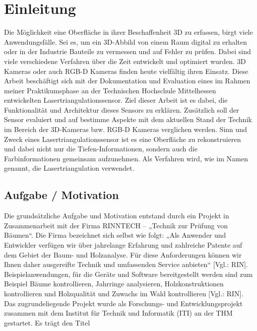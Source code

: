 \section{Einleitung}\label{einleitung}
Die Möglichkeit eine Oberfläche in ihrer Beschaffenheit 3D zu erfassen, birgt viele Anwendungsfälle. Sei es, um ein 3D-Abbild von einem Raum digital zu erhalten oder in der Industrie Bauteile zu vermessen und auf Fehler zu prüfen. Dabei sind viele verschiedene Verfahren über die Zeit entwickelt und optimiert wurden. 3D Kameras oder auch RGB-D Kameras finden heute vielfältig ihren Einsatz. Diese Arbeit beschäftigt sich mit der Dokumentation und Evaluation eines im Rahmen meiner Praktikumsphase an der Technischen Hochschule Mittelhessen entwickelten Lasertriangulationssensor. Ziel dieser Arbeit ist es dabei, die Funktionalität und Architektur dieses Sensors zu erklären. Zusätzlich soll der Sensor evaluiert und auf bestimme Aspekte mit dem aktuellen Stand der Technik im Bereich der 3D-Kameras bzw. RGB-D Kameras verglichen werden.
Sinn und Zweck eines  \linebreak Lasertriangulationssensor ist es eine Oberfläche zu rekonstruieren und dabei nicht nur die Tiefen-Informationen, sondern auch die Farbinformationen gemeinsam aufzunehmen. Als Verfahren wird, wie im Namen genannt, die Lasertriangulation verwendet.

	\subsection{Aufgabe / Motivation}
	Die grundsätzliche Aufgabe und Motivation entstand durch ein Projekt in Zusammenarbeit mit der Firma RINNTECH – „Technik zur Prüfung von Bäumen“. Die Firma bezeichnet sich selbst wie folgt: „Als Anwender und Entwickler verfügen wir über jahrelange Erfahrung und zahlreiche Patente auf dem Gebiet der Baum- und Holzanalyse. Für diese Anforderungen können wir Ihnen daher ausgereifte Technik und umfassenden Service anbieten“ [Vgl.: RIN]. Beispielanwendungen, für die Geräte und Software bereitgestellt werden sind zum Beispiel Bäume kontrollieren, Jahrringe analysieren, Holzkonstruktionen kontrollieren und Holzqualität und Zuwachs im Wald kontrollieren [Vgl.:  RIN]. Das zugrundeliegende Projekt wurde als Forschungs- und Entwicklungsprojekt zusammen mit dem Institut für Technik und Informatik (ITI) an der THM gestartet. Es trägt den Titel
	

